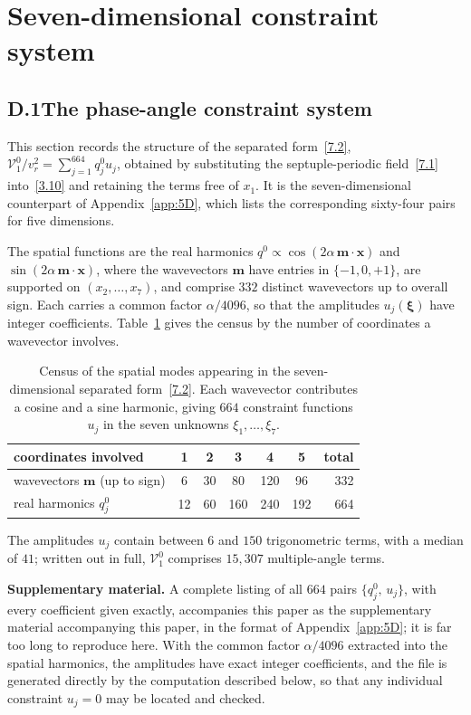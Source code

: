 \documentclass[11pt]{jfm}
\numberwithin{equation}{section}
\begin{document}
\section{Seven-dimensional constraint system}
\label{app:7D}
\subsection*{D.1\quad The phase-angle constraint system}
This section records the structure of the separated form~\eqref{7.2},
$\mathcal{V}_1^0/v_r^2 = \sum_{j=1}^{664} q_j^0 u_j$, obtained by substituting the septuple-periodic
field~\eqref{7.1} into~\eqref{3.10} and retaining the terms free of $x_1$. It is the
seven-dimensional counterpart of Appendix~\ref{app:5D}, which lists the corresponding
sixty-four pairs for five dimensions.

The spatial functions are the real harmonics
$q^0 \propto \cos(2\alpha\,\boldsymbol{m}\cdot\boldsymbol{x})$ and
$\sin(2\alpha\,\boldsymbol{m}\cdot\boldsymbol{x})$, where the wavevectors $\boldsymbol{m}$ have
entries in $\{-1,0,+1\}$, are supported on $(x_2,\dots,x_7)$, and comprise $332$ distinct wavevectors up to overall sign. Each carries a common factor $\alpha/4096$, so that the amplitudes $u_j(\boldsymbol{\xi})$
have integer coefficients. Table~\ref{tab:7Dmodes} gives the census by the number of coordinates
a wavevector involves.

\begin{table}
\centering
\begin{tabular}{lcccccr}
\hline
coordinates involved & 1 & 2 & 3 & 4 & 5 & total\\
\hline
wavevectors $\boldsymbol{m}$ (up to sign) & 6 & 30 & 80 & 120 & 96 & 332\\
real harmonics $q_j^0$ & 12 & 60 & 160 & 240 & 192 & 664\\
\hline
\end{tabular}
\caption{Census of the spatial modes appearing in the seven-dimensional separated
form~\eqref{7.2}. Each wavevector contributes a cosine and a sine harmonic, giving $664$
constraint functions $u_j$ in the seven unknowns $\xi_1,\dots,\xi_7$.}
\label{tab:7Dmodes}
\end{table}

The amplitudes $u_j$ contain between $6$ and $150$ trigonometric terms, with a median of $41$; written out in full, $\mathcal{V}_1^0$ comprises $15{,}307$ multiple-angle terms.

\medskip
\noindent\textbf{Supplementary material.} A complete listing of all $664$ pairs
$\{q_j^0,\,u_j\}$, with every coefficient given exactly, accompanies this paper as the
supplementary material accompanying this paper, in the format of Appendix~\ref{app:5D}; it is far
too long to reproduce here. With the common factor $\alpha/4096$ extracted into the spatial harmonics, the amplitudes have exact integer coefficients, and the file is generated directly by the computation described below, so that any individual constraint $u_j=0$ may be located and checked.
\end{document}
